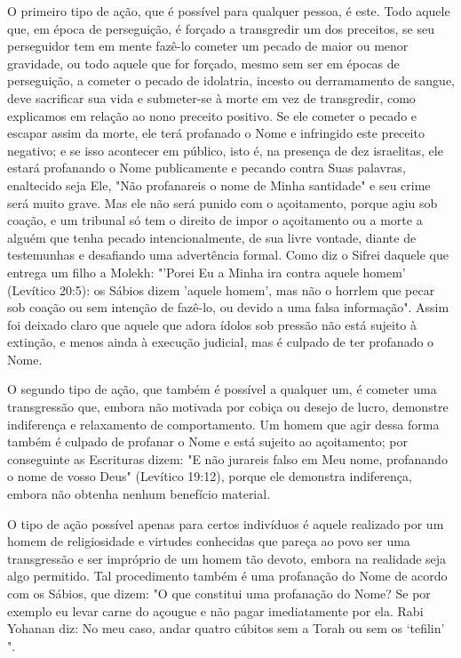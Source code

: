 \begin{itemize}
\begin{enumrate}
\begin{itemize}
\begin{itemize}
\begin{itemize}
O primeiro tipo de ação, que é possível para qualquer pessoa, é es­te.
Todo aquele que, em época de perseguição, é forçado a transgredir um dos
preceitos, se seu perseguidor tem em mente fazê-lo cometer um pecado de
maior ou menor gravidade, ou todo aquele que for forçado, mesmo sem ser
em épo­cas de perseguição, a cometer o pecado de idolatria, incesto ou
derramamento de sangue, deve sacrificar sua vida e submeter-se à morte
em vez de transgre­dir, como explicamos em relação ao nono preceito
positivo. Se ele cometer o pecado e escapar assim da morte, ele terá
profanado o Nome e infringido este preceito negativo; e se isso
acontecer em público, isto é, na presença de dez israelitas, ele estará
profanando o Nome publicamente e pecando contra Suas palavras,
enaltecido seja Ele, "Não profanareis o nome de Minha santidade" e seu
crime será muito grave. Mas ele não será punido com o açoitamento,
por­que agiu sob coação, e um tribunal só tem o direito de impor o
açoitamento ou a morte a alguém que tenha pecado intencionalmente, de
sua livre vontade, diante de testemunhas e desafiando uma advertência
formal. Como diz o Sifrei daquele que entrega um filho a Molekh: "'Porei
Eu a Minha ira contra aquele homem' (Levítico 20:5): os Sábios dizem
'aquele homem', mas não o horrlem que pecar sob coação ou sem intenção
de fazê-lo, ou devido a uma falsa infor­mação". Assim foi deixado claro
que aquele que adora ídolos sob pressão não está sujeito à extinção, e
menos ainda à execução judicial, mas é culpado de ter profanado o Nome.

O segundo tipo de ação, que também é possível a qualquer um, é cometer
uma transgressão que, embora não motivada por cobiça ou desejo de lucro,
demonstre indiferença e relaxamento de comportamento. Um homem que agir
dessa forma também é culpado de profanar o Nome e está sujeito ao
açoitamento; por conseguinte as Escrituras dizem: "E não jurareis falso
em Meu nome, profanando o nome de vosso Deus" (Levítico 19:12), porque
ele demons­tra indiferença, embora não obtenha nenhum benefício
material.

O tipo de ação possível apenas para certos indivíduos é aquele
reali­zado por um homem de religiosidade e virtudes conhecidas que
pareça ao po­vo ser uma transgressão e ser impróprio de um homem tão
devoto, embora na realidade seja algo permitido. Tal procedimento também
é uma profanação do Nome de acordo com os Sábios, que dizem: "O que
constitui uma profana­ção do Nome? Se por exemplo eu levar carne do
açougue e não pagar imediata­mente por ela. Rabi Yohanan diz: No meu
caso, andar quatro cúbitos sem a Torah ou sem os `tefilin' ".


\end{itemize}
\end{itemize}
\end{itemize}
\end{enumrate}
\end{itemize}
